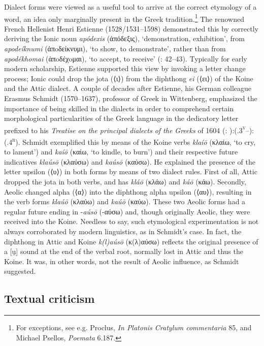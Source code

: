 Dialect forms were viewed as a useful tool to arrive at the correct etymology of a word, an idea only marginally present in the Greek tradition.\footnote{For exceptions, see e.g. Proclus, \textit{In Platonis Cratylum commentaria} 85, and Michael Psellos, \textit{Poemata} 6.187.} The renowned French Hellenist Henri Estienne (1528/1531–1598) demonstrated this by correctly deriving the Ionic noun \textit{apódexis} (ἀπόδεξις), ‘demonstration, exhibition’, from \textit{apodeíknumi} (ἀπoδείκνυμι), ‘to show, to demonstrate’, rather than from \textit{apodékhomai} (ἀπoδέχoμαι), ‘to accept, to receive’ (\citealt{Estienne1581}: 42–43). Typically for early modern scholarship, Estienne supported this view by invoking a letter change process; Ionic could drop the jota (⟨ι⟩) from the diphthong \textit{ei} (⟨ει⟩) of the Koine and the Attic dialect. A couple of decades after Estienne, his German colleague Erasmus Schmidt (1570–1637), professor of Greek in Wittenberg, emphasized the importance of being skilled in the dialects in order to comprehend certain morphological particularities of the Greek language in the dedicatory letter prefixed to his \textit{Treatise on the principal dialects of the Greeks} of 1604 (\citealt{Schmidt1604}: ):(.3\textsc{\textsuperscript{v}}–):(.4\textsc{\textsuperscript{r}}). Schmidt exemplified this by means of the Koine verbs \textit{klaíō} (κλαίω, ‘to cry, to lament’) and \textit{kaíō} (καίω, ‘to kindle, to burn’) and their respective future indicatives \textit{klaúsō} (κλαύσω) and \textit{kaúsō} (καύσω). He explained the presence of the letter upsilon (⟨υ⟩) in both forms by means of two dialect rules. First of all, Attic dropped the jota in both verbs, and has \textit{kláō} (κλάω) and \textit{káō} (κάω). Secondly, Aeolic changed alpha (⟨α⟩) into the diphthong alpha upsilon (⟨αυ⟩), resulting in the verb forms \textit{klaúō} (κλαύω) and \textit{kaúō} (καύω). These two Aeolic forms had a regular future ending in -\textit{aúsō} (-αύσω) and, though originally Aeolic, they were received into the Koine. Needless to say, such etymological experimentation is not always corroborated by modern linguistics, as in Schmidt’s case.{} In fact, the diphthong in Attic and Koine \textit{k(l)aúsō} (κ(λ)αύσω) reflects the original presence of a [u̯] sound at the end of the verbal root, normally lost in Attic and thus the Koine. It was, in other words, not the result of Aeolic influence, as Schmidt suggested.

\subsection{Textual criticism}

